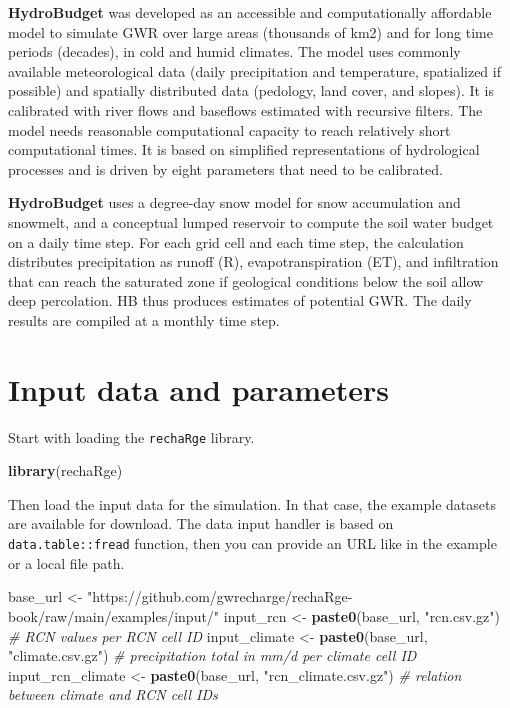 \documentclass[
]{book}
\newenvironment{Shaded}{\begin{snugshade}}{\end{snugshade}}
\newcommand{\CommentTok}[1]{\textcolor[rgb]{0.56,0.35,0.01}{\textit{#1}}}
\newcommand{\FunctionTok}[1]{\textcolor[rgb]{0.13,0.29,0.53}{\textbf{#1}}}
\newcommand{\NormalTok}[1]{#1}
\newcommand{\OtherTok}[1]{\textcolor[rgb]{0.56,0.35,0.01}{#1}}
\newcommand{\StringTok}[1]{\textcolor[rgb]{0.31,0.60,0.02}{#1}}
\begin{document}
\textbf{HydroBudget} was developed as an accessible and computationally affordable model to simulate GWR over large areas (thousands of km2) and for long time periods (decades), in cold and humid climates. The model uses commonly available meteorological data (daily precipitation and temperature, spatialized if possible) and spatially distributed data (pedology, land cover, and slopes). It is calibrated with river flows and baseflows estimated with recursive filters. The model needs reasonable computational capacity to reach relatively short computational times. It is based on simplified representations of hydrological processes and is driven by eight parameters that need to be calibrated.

\textbf{HydroBudget} uses a degree-day snow model for snow accumulation and snowmelt, and a conceptual lumped reservoir to compute the soil water budget on a daily time step. For each grid cell and each time step, the calculation distributes precipitation as runoff (R), evapotranspiration (ET), and infiltration that can reach the saturated zone if geological conditions below the soil allow deep percolation. HB thus produces estimates of potential GWR. The daily results are compiled at a monthly time step.

\hypertarget{input-data-and-parameters}{%
\section{Input data and parameters}\label{input-data-and-parameters}}

Start with loading the \texttt{rechaRge} library.

\begin{Shaded}
\begin{Highlighting}[]
\FunctionTok{library}\NormalTok{(rechaRge)}
\end{Highlighting}
\end{Shaded}

Then load the input data for the simulation. In that case, the example datasets are available for download. The data input handler is based on \texttt{data.table::fread} function, then you can provide an URL like in the example or a local file path.

\begin{Shaded}
\begin{Highlighting}[]
\NormalTok{base\_url }\OtherTok{\textless{}{-}} \StringTok{"https://github.com/gwrecharge/rechaRge{-}book/raw/main/examples/input/"}
\NormalTok{input\_rcn }\OtherTok{\textless{}{-}} \FunctionTok{paste0}\NormalTok{(base\_url, }\StringTok{"rcn.csv.gz"}\NormalTok{) }\CommentTok{\# RCN values per RCN cell ID}
\NormalTok{input\_climate }\OtherTok{\textless{}{-}} \FunctionTok{paste0}\NormalTok{(base\_url, }\StringTok{"climate.csv.gz"}\NormalTok{) }\CommentTok{\# precipitation total in mm/d per climate cell ID}
\NormalTok{input\_rcn\_climate }\OtherTok{\textless{}{-}} \FunctionTok{paste0}\NormalTok{(base\_url, }\StringTok{"rcn\_climate.csv.gz"}\NormalTok{) }\CommentTok{\# relation between climate and RCN cell IDs}
\end{Highlighting}
\end{Shaded}
\end{document}
